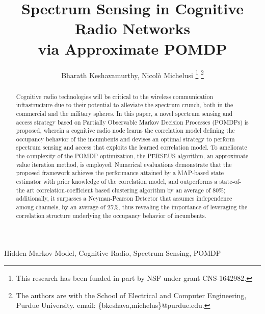 \documentclass[10pt,twocolumn]{IEEEtran}
\title{Spectrum Sensing in Cognitive Radio Networks
\\
via Approximate POMDP}
\author{Bharath Keshavamurthy, Nicol\`{o} Michelusi
\thanks{This research has been funded in part by NSF under grant CNS-1642982.}
\thanks{The authors are with the School of Electrical and Computer Engineering, Purdue University. email: \{bkeshava,michelus\}@purdue.edu.}
\vspace{-5mm}}
\begin{document}
 
\maketitle
{}
\begin{abstract}
Cognitive radio technologies will be critical to the wireless communication infrastructure due to their potential to alleviate the spectrum crunch, both in the commercial and the military spheres. In this paper, a novel spectrum sensing and access strategy based on Partially Observable Markov Decision Processes (POMDPs) is proposed, wherein a cognitive radio node learns the correlation model defining the occupancy behavior of the incumbents and devises an optimal strategy to perform spectrum sensing and access that exploits the learned correlation model. To ameliorate the complexity of the POMDP optimization, the PERSEUS algorithm, an approximate value iteration method, is employed. Numerical evaluations demonstrate that the proposed framework achieves the performance attained by a MAP-based state estimator with prior knowledge of the correlation model, and outperforms a state-of-the art correlation-coefficient based clustering algorithm by an average of 80\%; additionally, it surpasses a Neyman-Pearson Detector that assumes independence among channels, by an average of 25\%, thus revealing the importance of leveraging the correlation structure underlying the occupancy behavior of incumbents.
\end{abstract}
\begin{IEEEkeywords}
Hidden Markov Model, Cognitive Radio, Spectrum Sensing, POMDP
\end{IEEEkeywords}
\end{document}
